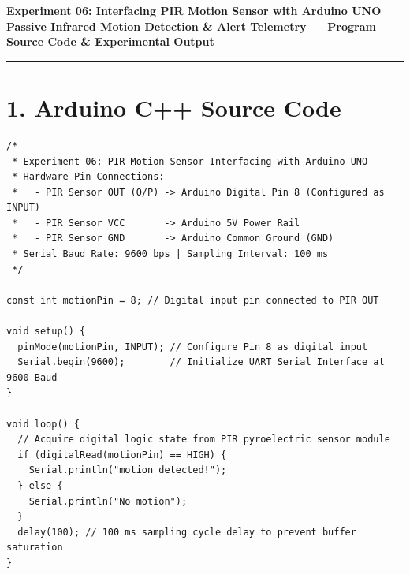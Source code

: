 \documentclass[11pt,a4paper]{article}
\begin{document}
\begin{center}
    {\large\bfseries Experiment 06: Interfacing PIR Motion Sensor with Arduino UNO}\\[0.08cm]
    {\normalsize\textbf{Passive Infrared Motion Detection \& Alert Telemetry --- Program Source Code \& Experimental Output}}
\end{center}
\vspace{-0.20cm}
\rule{\textwidth}{0.9pt}
\vspace{0.06cm}

\section*{1. Arduino C++ Source Code}

\begin{lstlisting}[style=bwArduino, title={\textbf{Listing 6.1: Microcontroller Firmware for PIR Motion Sensing and Serial Event Telemetry.}}]
/*
 * Experiment 06: PIR Motion Sensor Interfacing with Arduino UNO
 * Hardware Pin Connections:
 *   - PIR Sensor OUT (O/P) -> Arduino Digital Pin 8 (Configured as INPUT)
 *   - PIR Sensor VCC       -> Arduino 5V Power Rail
 *   - PIR Sensor GND       -> Arduino Common Ground (GND)
 * Serial Baud Rate: 9600 bps | Sampling Interval: 100 ms
 */

const int motionPin = 8; // Digital input pin connected to PIR OUT

void setup() {
  pinMode(motionPin, INPUT); // Configure Pin 8 as digital input
  Serial.begin(9600);        // Initialize UART Serial Interface at 9600 Baud
}

void loop() {
  // Acquire digital logic state from PIR pyroelectric sensor module
  if (digitalRead(motionPin) == HIGH) {
    Serial.println("motion detected!");
  } else {
    Serial.println("No motion");
  }
  delay(100); // 100 ms sampling cycle delay to prevent buffer saturation
}
\end{lstlisting}

\vspace{0.06cm}

\end{document}
